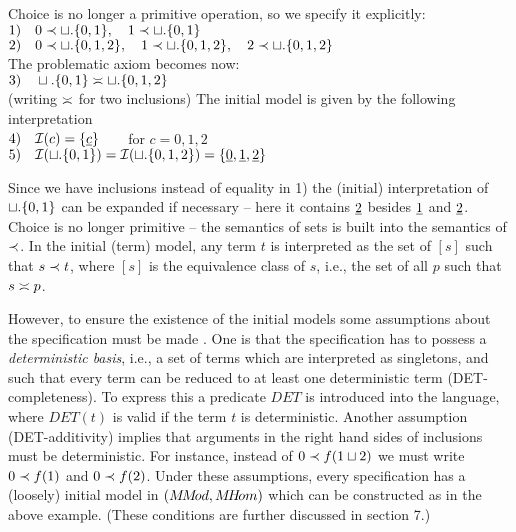 {\begin{Example}\label{ex:unionb}  
Choice is no longer a primitive operation, so we specify it explicitly:\\[1ex]
\hspace*{2em}
	$1)\ \ \  0 \mathrel{\prec} \sqcup.\{0,1\}, \ \ \ 1 \mathrel{\prec} \sqcup.\{0,1\}$ \\[.5ex]
\hspace*{2em}
	$2) \ \ \ 0 \mathrel{\prec} \sqcup.\{0,1,2\},\ \ \  1 \mathrel{\prec} \sqcup.\{0,1,2\},\ \ \   2 \mathrel{\prec} 
	\sqcup.\{0,1,2\}$ \\[1ex]
The problematic axiom becomes now:\\[1ex]
\hspace*{2em}	$3)\ \ \  \sqcup.\{0,1\} \mathrel{\asymp}  \sqcup.\{0,1,2\} $ \\[1ex]
(writing $\mathrel{\asymp}$ for two inclusions)
The initial model is given by the following interpretation\\[1ex]
\hspace*{2em}
	$4)\ \ \  {\cal I}(c) =\{\underline{c}\}$\ \ \ \  for $ c=0,1,2$ \\[.5ex]
\hspace*{2em}
	$5)\ \ \ {\cal I}(\sqcup.\{0,1\}) = {\cal I}(\sqcup.\{0,1,2\}) = \{\underline{0},\underline{1},\underline{2}\}$
\end{Example}

Since we have inclusions instead of equality in 1) the (initial) interpretation 
of $\sqcup.\{0,1\}$ can be expanded if 
necessary -- here it contains $\underline{2}$ besides $\underline{1}$ and $\underline{2}$. 
Choice is no longer primitive -- the semantics of sets is built 
into the semantics of $\mathrel{\prec}$. In the initial (term) model, any term $t$ is 
interpreted as the set of $[s]$ such that $s\mathrel{\prec} t$, 
where $[s]$ is the equivalence class of $s$, i.e., the set of all $p$ such 
that $s\mathrel{\asymp} p$.

However, to ensure the existence of the initial models some assumptions 
about the specification must 
be made \cite{c:59, c:58}. One is that the specification has to possess a {\em deterministic basis}, 
i.e., a set of terms 
which are interpreted as singletons, and such that every term can be reduced to at least one deterministic 
term (DET-completeness). To express this a predicate $DET$ is introduced 
into the language, where $DET(t)$ 
is valid if the term $t$ is deterministic. 
Another assumption (DET-additivity) implies that arguments in the right hand sides of inclusions 
must be deterministic. For instance, instead of $0\mathrel{\prec} f(1\sqcup 2)$ we must 
write $0\mathrel{\prec} f(1)$ and $0\mathrel{\prec} f(2)$. Under these 
assumptions, every specification has a (loosely) initial model in 
$(M\!M\!od,M\!H\!om)$ which can be constructed 
as in the above example. (These conditions are further discussed in section 7.)

}
